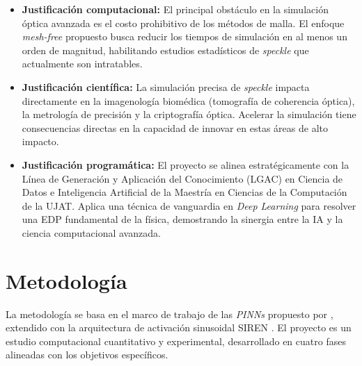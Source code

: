 \begin{itemize}
    \item \textbf{Justificación computacional:} El principal obstáculo en la
    simulación óptica avanzada es el costo prohibitivo de los métodos de malla.
    El enfoque \textit{mesh-free} propuesto busca reducir los tiempos de
    simulación en al menos un orden de magnitud, habilitando estudios estadísticos
    de \textit{speckle} que actualmente son intratables.

    \item \textbf{Justificación científica:} La simulación precisa de
    \textit{speckle} impacta directamente en la imagenología biomédica
    (tomografía de coherencia óptica), la metrología de precisión y la
    criptografía óptica. Acelerar la simulación tiene consecuencias directas en
    la capacidad de innovar en estas áreas de alto impacto.

    \item \textbf{Justificación programática:} El proyecto se alinea
    estratégicamente con la Línea de Generación y Aplicación del Conocimiento
    (LGAC) en Ciencia de Datos e Inteligencia Artificial de la Maestría en
    Ciencias de la Computación de la UJAT. Aplica una técnica de vanguardia en
    \textit{Deep Learning} para resolver una EDP fundamental de la física,
    demostrando la sinergia entre la IA y la ciencia computacional avanzada.
\end{itemize}

\section{Metodología}

La metodología se basa en el marco de trabajo de las \textit{PINNs} propuesto
por \textcite{raissi2019physics}, extendido con la arquitectura de activación
sinusoidal SIREN \parencite{sitzmann2020siren}. El proyecto es un estudio
computacional cuantitativo y experimental, desarrollado en cuatro fases
alineadas con los objetivos específicos.


